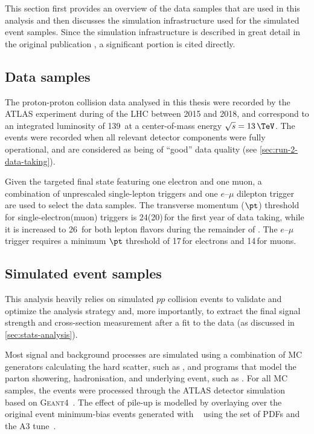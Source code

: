 %

This section first provides an overview of the data samples that are used in this analysis and then discusses the simulation infrastructure used for the simulated event samples.
Since the simulation infrastructure is described in great detail in the original publication \cite{HWWPaper}, a significant portion is cited directly. 

\subsection{Data samples}
\label{subsec:data-samples}
The proton-proton collision data analysed in this thesis were recorded by the ATLAS experiment during \RunTwo of the LHC between 2015 and 2018, and correspond to an integrated luminosity of 139\ifb\ at a center-of-mass energy $\sqrt{s} = 13\,\TeV$. 
The events were recorded when all relevant detector components were fully operational, and are considered as being of ``good'' data quality (see \cref{sec:run-2-data-taking}).

Given the targeted final state featuring one electron and one muon, a combination of unprescaled single-lepton triggers and one $e$--$\mu$ dilepton trigger~\cite{TRIG-2018-05,TRIG-2018-01} are used to select the data samples. 
The transverse momentum ($\pt$) threshold for single-electron(muon) triggers is 24(20)\,\GeV for the first year of data taking, while it is increased to 26~\GeV for both lepton flavors during the remainder of \RunTwo.\cite{HWWPaper}
The $e$--$\mu$ trigger requires a minimum $\pt$ threshold of 17\,\GeV for electrons and 14\,\GeV for muons.\cite{HWWPaper}


\subsection{Simulated event samples}
\label{subsec:simulated-event-samples}

This analysis heavily relies on simulated $pp$ collision events to validate and optimize the analysis strategy and, more importantly, to extract the final signal strength and cross-section measurement after a fit to the data (as discussed in \cref{sec:stats-analysis}). 

Most signal and background processes are simulated using a combination of MC generators calculating the hard scatter, such as \Powheg, and programs that model the parton showering, hadronisation, and underlying event, such as \PythiaEight.
For all MC samples, the events were processed through the ATLAS detector simulation~\cite{SOFT-2010-01} based on
\textsc{Geant4}~\cite{Agostinelli:2002hh}.\cite{PLACEHOLDER:FOR:PAPER} 
The effect of pile-up is modelled by overlaying over the original event minimum-bias events generated with ~\cite{Sjostrand:2007gs} using the \nnpdftwo set of PDFs and the A3 tune~\cite{ATL-PHYS-PUB-2016-017}.


